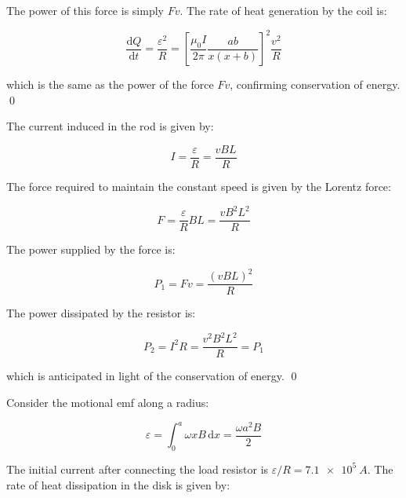 \documentclass[12pt]{article}
\begin{document}
The power of this force is simply $Fv$. The rate of heat generation by the coil is:

\begin{equation}
    \frac{\mathrm{d}Q}{\mathrm{d}t} = \frac{\varepsilon^{2}}{R} =  \left[ \frac{\mu_{0}I}{2\pi} \frac{ab}{x(x + b)} \right]^{2} \frac{v^{2}}{R}
\end{equation}

which is the same as the power of the force $Fv$, confirming conservation of energy.
\qed



The current induced in the rod is given by:

\begin{equation}
    I = \frac{\varepsilon}{R} = \frac{vBL}{R}
\end{equation}

The force required to maintain the constant speed is given by the Lorentz force:

\begin{equation}
    F = \frac{\varepsilon}{R} BL = \frac{vB^{2}L^{2}}{R}
\end{equation}

The power supplied by the force is:

\begin{equation}
    P_{1} = Fv = \frac{(vBL)^{2}}{R}
\end{equation}

The power dissipated by the resistor is:

\begin{equation}
    P_{2} = I^{2}R = \frac{v^{2}B^{2}L^{2}}{R} = P_{1}
\end{equation}

which is anticipated in light of the conservation of energy.
\qed



Consider the motional emf along a radius:

\begin{equation}
    \varepsilon = \int_{0}^{a} \omega x B \, \mathrm{d}x = \frac{\omega a^{2}B}{2}
\end{equation}

The initial current after connecting the load resistor is $\varepsilon/R = \qty{7.1e5}{A}$. The rate of heat dissipation in the disk is given by:
\end{document}
